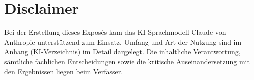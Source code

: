\section*{Disclaimer}

Bei der Erstellung dieses Exposés kam das KI-Sprachmodell Claude von Anthropic unterstützend zum Einsatz. Umfang und Art der Nutzung sind im Anhang (KI-Verzeichnis) im Detail dargelegt. Die inhaltliche Verantwortung, s\"amtliche fachlichen Entscheidungen sowie die kritische Auseinandersetzung mit den Ergebnissen liegen beim Verfasser.
\newpage
